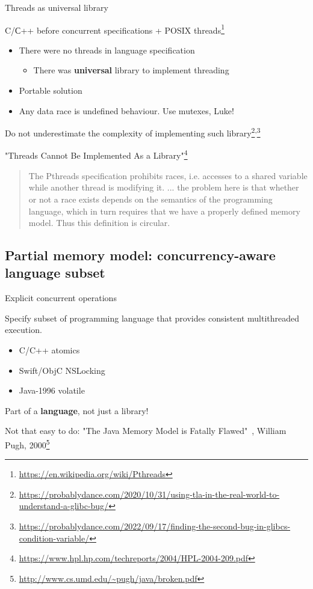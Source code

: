 \begin{frame}[t]{Threads as universal library}

C/С++ before concurrent specifications + POSIX threads\footnote{\tiny\url{https://en.wikipedia.org/wiki/Pthreads}}

\pause
\begin{itemize}
  \item There were no threads in language specification
  \begin{itemize}
    \item There was \textbf{universal} library to implement threading
  \end{itemize}
  \item Portable solution
  \item Any data race is undefined behaviour. Use mutexes, Luke!  
\end{itemize}

\pause
Do not underestimate the complexity of implementing such library\footnote<3->{\tiny\url{https://probablydance.com/2020/10/31/using-tla-in-the-real-world-to-understand-a-glibc-bug/}}\textsuperscript{,}\footnote<3->{\tiny\url{https://probablydance.com/2022/09/17/finding-the-second-bug-in-glibcs-condition-variable/}}

\pause

"Threads Cannot Be Implemented As a Library"\footnote<4->{\tiny\url{https://www.hpl.hp.com/techreports/2004/HPL-2004-209.pdf}}
\pause

\begin{quote}
 The Pthreads specification prohibits races, i.e. accesses to a shared variable while another thread is modifying it. ... the
 problem here is that whether or not a race exists depends on the semantics of the programming language, which in turn requires that we have a properly defined memory model.
 Thus this definition is circular.
\end{quote}

\end{frame}


\subsection{Partial memory model: concurrency-aware language subset}
\showTOCSub


\begin{frame}{Explicit concurrent operations}

Specify subset of programming language that provides consistent multithreaded execution.

\begin{itemize}
\pause \item C/C++ atomics
\pause \item Swift/ObjC NSLocking
\pause \item Java-1996 volatile
\end{itemize}

\pause
Part of a \textbf{language}, not just a library!

\pause
Not that easy to do: "The Java Memory Model is Fatally Flawed"\ , William Pugh, 2000\footnote<6->{\tiny\url{http://www.cs.umd.edu/~pugh/java/broken.pdf}}

\end{frame}

